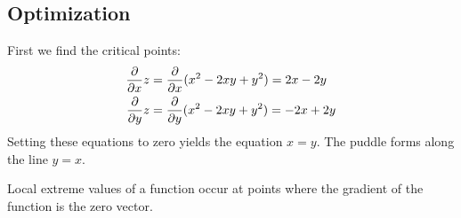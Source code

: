 \subsection{Optimization}

\BEN

\item %
First we find the critical points:
\begin{align*}
    \frac{\partial}{\partial x} z &= \frac{\partial}{\partial x} (x^2-2xy+y^2) = 2x-2y \\
    \frac{\partial}{\partial y} z &= \frac{\partial}{\partial y} (x^2-2xy+y^2) = -2x+2y \\    
\end{align*}
Setting these equations to zero yields the equation $x=y$. The puddle forms along the line $y=x$.

\item

Local extreme values of a function occur at points where the gradient of
the function is the zero vector.

